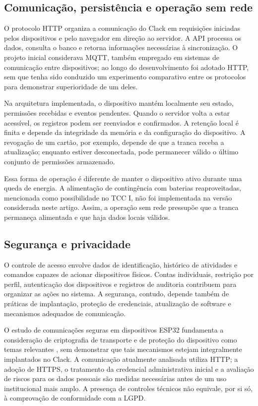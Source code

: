 \documentclass[12pt]{article}
\begin{document}
\subsection{Comunicação, persistência e operação sem rede}

O protocolo HTTP organiza a comunicação do Clack em requisições iniciadas pelos dispositivos e pelo navegador em direção ao servidor. A API processa os dados, consulta o banco e retorna informações necessárias à sincronização. O projeto inicial considerava MQTT, também empregado em sistemas de comunicação entre dispositivos; ao longo do desenvolvimento foi adotado HTTP, sem que tenha sido conduzido um experimento comparativo entre os protocolos para demonstrar superioridade de um deles.

Na arquitetura implementada, o dispositivo mantém localmente seu estado, permissões recebidas e eventos pendentes. Quando o servidor volta a estar acessível, os registros podem ser reenviados e confirmados. A retenção local é finita e depende da integridade da memória e da configuração do dispositivo. A revogação de um cartão, por exemplo, depende de que a tranca receba a atualização; enquanto estiver desconectada, pode permanecer válido o último conjunto de permissões armazenado.

Essa forma de operação é diferente de manter o dispositivo ativo durante uma queda de energia. A alimentação de contingência com baterias reaproveitadas, mencionada como possibilidade no TCC I, não foi implementada na versão considerada neste artigo. Assim, a operação sem rede pressupõe que a tranca permaneça alimentada e que haja dados locais válidos.

\subsection{Segurança e privacidade}

O controle de acesso envolve dados de identificação, histórico de atividades e comandos capazes de acionar dispositivos físicos. Contas individuais, restrição por perfil, autenticação dos dispositivos e registros de auditoria contribuem para organizar as ações no sistema. A segurança, contudo, depende também de práticas de implantação, proteção de credenciais, atualização de software e mecanismos adequados de comunicação.

O estudo de comunicações seguras em dispositivos ESP32 fundamenta a consideração de criptografia de transporte e de proteção do dispositivo como temas relevantes \cite{rosa2022iot}, sem demonstrar que tais mecanismos estejam integralmente implantados no Clack. A comunicação atualmente analisada utiliza HTTP; a adoção de HTTPS, o tratamento da credencial administrativa inicial e a avaliação de riscos para os dados pessoais são medidas necessárias antes de um uso institucional mais amplo. A presença de controles técnicos não equivale, por si só, à comprovação de conformidade com a LGPD.
\end{document}
